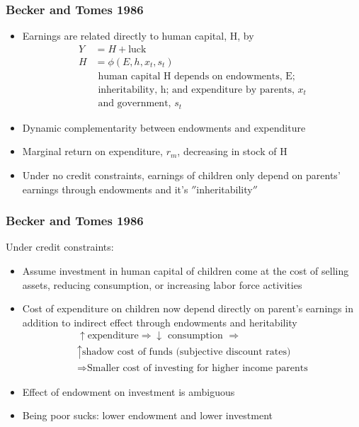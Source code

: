 \documentclass{beamer}
\begin{document}

\begin{frame}
\frametitle{Becker and Tomes 1986}
\begin{itemize}
\item Earnings are related directly to human capital, H, by 
\begin{align*}
Y &= H + \text{luck } \\
H &= \phi \left(E, h, x_{t}, s_{t} \right) \\
& \text{ human capital H depends on endowments,  E;} \\
& \text{ inheritability, h; and expenditure by parents, } x_{t} \\
& \text{ and government, }s_{t}  
\end{align*}

\item Dynamic complementarity between endowments and expenditure
\item Marginal return on expenditure, $r_{m}$, decreasing in stock of H

\item Under no credit constraints, earnings of children only depend on parents' earnings through endowments and it's $''$inheritability$''$

\end{itemize}
\end{frame}


\begin{frame}
\frametitle{Becker and Tomes 1986}
Under credit constraints:  \\
\begin{itemize}
\item Assume investment in human capital of children come at the cost of selling assets, reducing consumption, or increasing labor force activities

\item Cost of expenditure on children now depend directly on parent's earnings in addition to indirect effect through endowments and heritability 
\begin{align*}
\uparrow \text{expenditure}  \Rightarrow \downarrow \text{ consumption } \Rightarrow  \\
 \uparrow \text{shadow cost of funds (subjective discount rates)} \\
\Rightarrow \text{Smaller cost of investing for higher income parents} 
\end{align*}

\item Effect of endowment on investment is ambiguous
\item Being poor sucks: lower endowment and lower investment
\end{itemize}
\end{frame}
\end{document}
